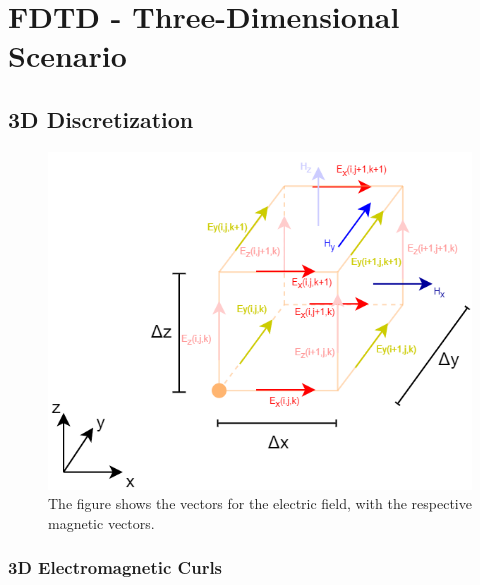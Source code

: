 
\chapter{FDTD - Three-Dimensional Scenario} %

\label{Chapter4} %


\section{3D Discretization}

\begin{figure}[h!]
	\centering
	\includegraphics[scale=0.6]{Figures/fdtd3dFull}
	\decoRule
	\caption[3D Electric Discretization]{The figure shows the vectors for the electric field, with the respective magnetic vectors.}
	\label{fig:fdtd3dFull}
\end{figure}

\subsection{3D Electromagnetic Curls}

